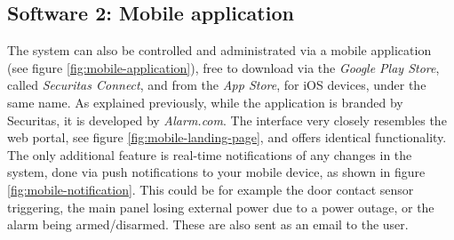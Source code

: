 \subsection{Software 2: Mobile application} \label{ch:system:mobile-app}
The system can also be controlled and administrated via a mobile application (see figure \ref{fig:mobile-application}), free to download via the \textit{Google Play Store}, called \textit{Securitas Connect}, and from the \textit{App Store}, for iOS devices, under the same name. As explained previously, while the application is branded by Securitas, it is developed by \textit{Alarm.com}. The interface very closely resembles the web portal, see figure \ref{fig:mobile-landing-page}, and offers identical functionality. The only additional feature is real-time notifications of any changes in the system, done via push notifications to your mobile device, as shown in figure \ref{fig:mobile-notification}. This could be for example the door contact sensor triggering, the main panel losing external power due to a power outage, or the alarm being armed/disarmed. These are also sent as an email to the user.
